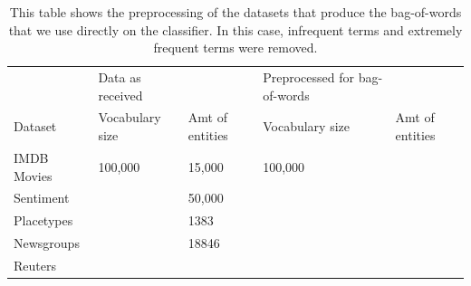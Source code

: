 \begin{table}[]
	\begin{tabular}{lllll}
		& Data as received &                 & Preprocessed for bag-of-words &                 \\
		Dataset     & Vocabulary size  & Amt of entities & Vocabulary size                & Amt of entities \\
		IMDB Movies & 100,000          & 15,000          & 100,000                        &                 \\
		Sentiment   &                  & 50,000          &                                &                 \\
		Placetypes  &                  & 1383            &                                &                 \\
		Newsgroups  &                  & 18846           &                                &                 \\
		Reuters     &                  &                 &                                &                
	\end{tabular}
	\caption{This table shows the preprocessing of the datasets that produce the bag-of-words that we use directly on the classifier. In this case, infrequent terms and extremely frequent terms were removed.}
	\label{table:BowStats}
\end{table}

